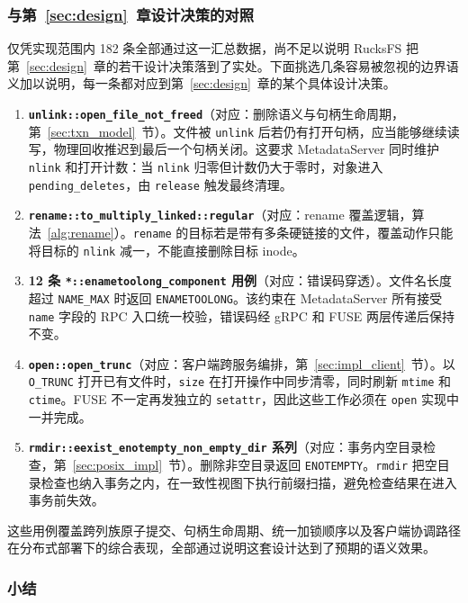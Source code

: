 \subsubsection{与第~\ref{sec:design}~章设计决策的对照}
\label{sec:pjdfstest-semantic}

仅凭实现范围内 182 条全部通过这一汇总数据，尚不足以说明 RucksFS 把第~\ref{sec:design}~章的若干设计决策落到了实处。下面挑选几条容易被忽视的边界语义加以说明，每一条都对应到第~\ref{sec:design}~章的某个具体设计决策。

\begin{enumerate}
    \item \textbf{\texttt{unlink::open\_file\_not\_freed}}（对应：删除语义与句柄生命周期，第~\ref{sec:txn_model}~节）。文件被 \texttt{unlink} 后若仍有打开句柄，应当能够继续读写，物理回收推迟到最后一个句柄关闭。这要求 MetadataServer 同时维护 \texttt{nlink} 和打开计数：当 \texttt{nlink} 归零但计数仍大于零时，对象进入 \texttt{pending\_deletes}，由 \texttt{release} 触发最终清理。
    \item \textbf{\texttt{rename::to\_multiply\_linked::regular}}（对应：rename 覆盖逻辑，算法~\ref{alg:rename}）。\texttt{rename} 的目标若是带有多条硬链接的文件，覆盖动作只能将目标的 \texttt{nlink} 减一，不能直接删除目标 inode。
    \item \textbf{12 条 \texttt{*::enametoolong\_component} 用例}（对应：错误码穿透）。文件名长度超过 \texttt{NAME\_MAX} 时返回 \texttt{ENAMETOOLONG}。该约束在 MetadataServer 所有接受 \texttt{name} 字段的 RPC 入口统一校验，错误码经 gRPC 和 FUSE 两层传递后保持不变。
    \item \textbf{\texttt{open::open\_trunc}}（对应：客户端跨服务编排，第~\ref{sec:impl_client}~节）。以 \texttt{O\_TRUNC} 打开已有文件时，\texttt{size} 在打开操作中同步清零，同时刷新 \texttt{mtime} 和 \texttt{ctime}。FUSE 不一定再发独立的 \texttt{setattr}，因此这些工作必须在 \texttt{open} 实现中一并完成。
    \item \textbf{\texttt{rmdir::eexist\_enotempty\_non\_empty\_dir} 系列}（对应：事务内空目录检查，第~\ref{sec:posix_impl}~节）。删除非空目录返回 \texttt{ENOTEMPTY}。\texttt{rmdir} 把空目录检查也纳入事务之内，在一致性视图下执行前缀扫描，避免检查结果在进入事务前失效。
\end{enumerate}

这些用例覆盖跨列族原子提交、句柄生命周期、统一加锁顺序以及客户端协调路径在分布式部署下的综合表现，全部通过说明这套设计达到了预期的语义效果。

\subsubsection{小结}


